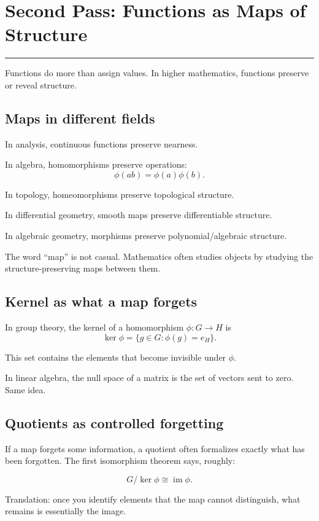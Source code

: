 \documentclass[12pt]{article}
\newcommand{\chapterline}{\vspace{0.4em}\hrule\vspace{0.8em}}
\begin{document}
\newpage
\section{Second Pass: Functions as Maps of Structure}
\chapterline

Functions do more than assign values. In higher mathematics, functions preserve or reveal structure.

\subsection{Maps in different fields}

In analysis, continuous functions preserve nearness.

In algebra, homomorphisms preserve operations:
\[
\phi(ab)=\phi(a)\phi(b).
\]

In topology, homeomorphisms preserve topological structure.

In differential geometry, smooth maps preserve differentiable structure.

In algebraic geometry, morphisms preserve polynomial/algebraic structure.

The word ``map'' is not casual. Mathematics often studies objects by studying the structure-preserving maps between them.

\subsection{Kernel as what a map forgets}

In group theory, the kernel of a homomorphism $\phi:G\to H$ is
\[
\ker\phi=\{g\in G:\phi(g)=e_H\}.
\]

This set contains the elements that become invisible under $\phi$.

In linear algebra, the null space of a matrix is the set of vectors sent to zero. Same idea.

\subsection{Quotients as controlled forgetting}

If a map forgets some information, a quotient often formalizes exactly what has been forgotten. The first isomorphism theorem says, roughly:

\[
G/\ker\phi\cong \operatorname{im}\phi.
\]

Translation: once you identify elements that the map cannot distinguish, what remains is essentially the image.
\end{document}
